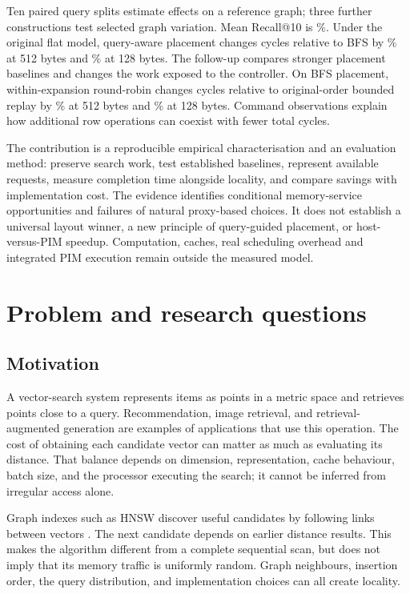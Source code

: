 \documentclass[11pt,a4paper]{report}
\begin{document}
Ten paired query splits estimate effects on a reference graph; three further constructions test selected graph variation. Mean Recall@10 is \SiftRecall\%. Under the original flat model, query-aware placement changes cycles relative to BFS by \QADeltaFloat\% at 512 bytes and \QADeltaCompact\% at 128 bytes. The follow-up compares stronger placement baselines and changes the work exposed to the controller. On BFS placement, within-expansion round-robin changes cycles relative to original-order bounded replay by \RoundRobinBFSMeanFloat\% at 512 bytes and \RoundRobinBFSMeanCompact\% at 128 bytes. Command observations explain how additional row operations can coexist with fewer total cycles.

The contribution is a reproducible empirical characterisation and an evaluation method: preserve search work, test established baselines, represent available requests, measure completion time alongside locality, and compare savings with implementation cost. The evidence identifies conditional memory-service opportunities and failures of natural proxy-based choices. It does not establish a universal layout winner, a new principle of query-guided placement, or host-versus-PIM speedup. Computation, caches, real scheduling overhead and integrated PIM execution remain outside the measured model.
\tableofcontents
\listoffigures
\listoftables
\clearpage{}

\chapter{Problem and research questions}
\label{ch:intro}
\section{Motivation}
A vector-search system represents items as points in a metric space and retrieves points close to a query. Recommendation, image retrieval, and retrieval-augmented generation are examples of applications that use this operation. The cost of obtaining each candidate vector can matter as much as evaluating its distance. That balance depends on dimension, representation, cache behaviour, batch size, and the processor executing the search; it cannot be inferred from irregular access alone.

Graph indexes such as HNSW discover useful candidates by following links between vectors \cite{hnsw}. The next candidate depends on earlier distance results. This makes the algorithm different from a complete sequential scan, but does not imply that its memory traffic is uniformly random. Graph neighbours, insertion order, the query distribution, and implementation choices can all create locality.
\end{document}
